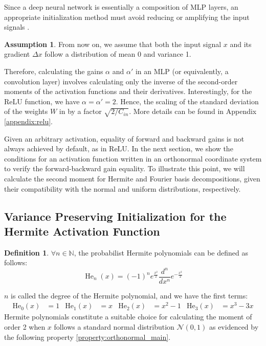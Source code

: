 \documentclass{article} %
\theoremstyle{plain}
\theoremstyle{definition}
\newtheorem{definition}[theorem]{Definition}
\newtheorem{assumption}[theorem]{Assumption}
\theoremstyle{remark}
\begin{document}
Since a deep neural network is essentially a composition of MLP layers, an appropriate initialization method must avoid reducing or amplifying the input signals \cite{he2015delving}.
\begin{assumption}
    From now on, we assume that both the input signal $x$ and its gradient $\Delta x$ follow a distribution of mean 0 and variance 1. %
\end{assumption}
Therefore, calculating the gains $\alpha$ and $\alpha'$ in an MLP (or equivalently, a convolution layer) involves calculating only the inverse of the second-order moments of the activation functions and their derivatives. Interestingly, for the ReLU function, we have $\alpha = \alpha' = 2$. Hence, the scaling of the standard deviation of the weights $W$ in \cite{he2015delving} by a factor $\sqrt{2/C_{in}}$. More details can be found in Appendix \ref{appendix:relu}.

Given an arbitrary activation, equality of forward and backward gains is not always achieved by default, as in ReLU. In the next section, we show the conditions for an activation function written in an orthonormal coordinate system to verify the forward-backward gain equality. To illustrate this point, we will calculate the second moment for Hermite and Fourier basis decompositions, given their compatibility with the normal and uniform distributions, respectively.

\subsection{Variance Preserving Initialization for the Hermite Activation Function}
\begin{definition}
$\forall n \in \mathbb{N}$, the probabilist Hermite polynomials can be defined as follows: 
\begin{equation}
\label{eq:hermite_def}
    \operatorname{He}_n(x)=(-1)^n e^{\frac{x^2}{2}} \frac{d^n}{d x^n} e^{-\frac{x^2}{2}}
\end{equation}
\end{definition}
$n$ is called the degree of the Hermite polynomial, and we have the first terms:
\begin{equation*}
\begin{aligned}
\mathrm{He}_0(x)&=1 & \mathrm{He}_1(x)&=x & \mathrm{He}_2(x)&=x^2-1 & \mathrm{He}_3(x)&=x^3-3 x 
\end{aligned}
\end{equation*}
Hermite polynomials constitute a suitable choice for calculating the moment of order 2 when $x$ follows a standard normal distribution $\mathcal{N}(0,1)$ as evidenced by the following property \ref{property:orthonormal_main}.
\end{document}
